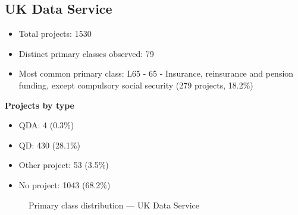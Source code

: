 \subsection{UK Data Service}

\begin{itemize}
    \item Total projects: 1530
    \item Distinct primary classes observed: 79
    \item Most common primary class: L65 - 65 - Insurance, reinsurance and pension funding, except compulsory social security (279 projects, 18.2\%)
\end{itemize}
\textbf{Projects by type}
\begin{itemize}
    \item QDA: 4 (0.3\%)
    \item QD: 430 (28.1\%)
    \item Other project: 53 (3.5\%)
    \item No project: 1043 (68.2\%)
\end{itemize}

\begin{figure}[h]
    \centering
    
    \caption{Primary class distribution --- UK Data Service}
\end{figure}


